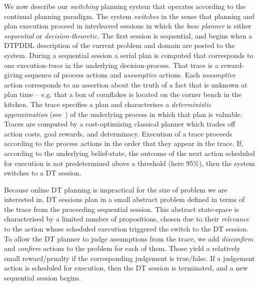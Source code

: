 
We now describe our {\em switching} planning system that operates
according to the continual planning paradigm. The system {\em
switches} in the sense that planning and plan execution proceed in
interleaved sessions in which the {\em base planner} is either {\em
sequential} or {\em decision-theoretic}.
The first session is sequential, and begins when a DTPDDL description
of the current problem and domain are posted to the system.  During a
sequential session a serial plan is computed that corresponds to one
execution-{\em trace} in the underlying decision-process. That trace
is a reward-giving sequence of process actions and {\em assumptive}
actions. Each {\em assumptive} action corresponds to an assertion
about the truth of a fact that is unknown at plan time -- e.g. that a
box of cornflakes is located on the corner bench in the kitchen. The
trace specifies a plan and characterises a {\em deterministic
approximation} (see~\cite{yoon:etal:2008}) of the underlying process
in which that plan is valuable. Traces are computed by a
cost-optimising classical planner which trades off action costs, goal
rewards, and determinacy. Execution of a trace proceeds according to
the process actions in the order that they appear in the trace. If,
according to the underlying belief-state, the outcome of the next
action scheduled for execution is not predetermined above a threshold
(here 95\%), then the system switches to a DT session.


Because online DT planning is impractical for the size of problem we
are interested in, DT sessions plan in a small abstract problem
defined in terms of the trace from the proceeding sequential
session. This abstract state-space is characterised by a limited
number of propositions, chosen due to their {\em relevance} to the
action whose scheduled execution triggered the switch to the DT
session.
To allow the DT planner to judge assumptions from the trace, we add
{\em disconfirm} and {\em confirm} actions to the problem for each of
them. Those yield a relatively small reward/penalty if the
corresponding judgement is true/false. If a judgement action is
scheduled for execution, then the DT session is terminated, and
a new sequential session begins.

